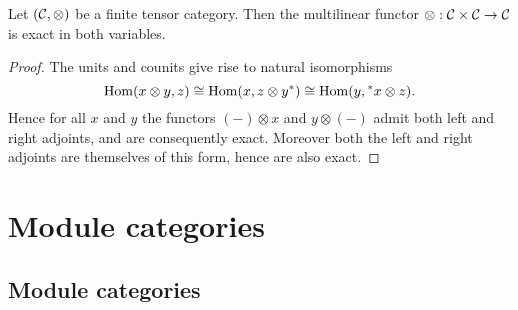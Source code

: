 \documentclass{amsart}
\begin{document}
\begin{lemma} \cite[2.1.8]{MR1797619} \cite[Prop. 1.13.1]{EGNO}  \label{lma:RigidIsExact}
	Let $(\mathcal C, \otimes)$ be a finite tensor category. Then the multilinear functor $\otimes: \mathcal C \times \mathcal C \to \mathcal C$ is exact in both variables. 
\end{lemma}

\begin{proof}
	The units and counits give rise to natural isomorphisms
 \begin{equation*} 
 	\operatorname{Hom}(x \otimes y, z) \cong \operatorname{Hom}( x, z \otimes y^*) \cong \operatorname{Hom}(y, {}^*x \otimes z).
 \end{equation*}
	Hence for all $x$ and $y$ the functors $(-)\otimes x$ and $y \otimes (-)$ admit both left and right adjoints, and are consequently exact. Moreover both the left and right adjoints are themselves of this form, hence are also  exact. 
\end{proof}




\section{Module categories} \label{sec:tc-bimod}

\subsection{Module categories} %
\end{document}
